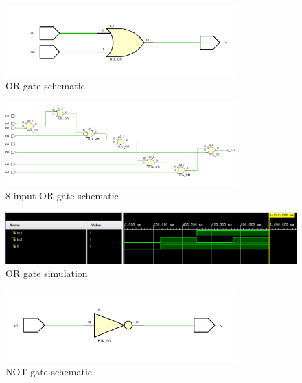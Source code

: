 \documentclass[pdftex,12pt,a4paper]{article}
\begin{document}
    \begin{figure}[H]
    	\centering
    	\includegraphics[width=0.8\textwidth]{schematic/or_schematic.png}	
    	\caption{OR gate schematic}
    	\label{OR gate schematic}
    \end{figure}
    
    \begin{figure}[H]
    	\centering
    	\includegraphics[width=0.8\textwidth]{schematic/8or_schematic.png}	
    	\caption{8-input OR gate schematic}
    	\label{8-input OR gate schematic}
    \end{figure}
    
    \begin{figure}[H]
    	\centering
    	\includegraphics[width=1\textwidth]{simulations/or_sim.png}	
    	\caption{OR gate simulation}
    	\label{OR gate simulation}
    \end{figure}
    
    \begin{figure}[H]
    	\centering
    	\includegraphics[width=0.8\textwidth]{schematic/not_schematic.png}	
    	\caption{NOT gate schematic}
    	\label{NOT gate schematic}
    \end{figure}
    
\end{document}
